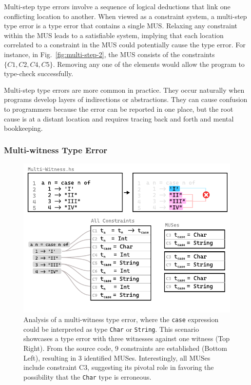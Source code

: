 \documentclass[pdflatex,lineno,sn-nature,Numbered]{sn-jnl}%
\begin{document}
Multi-step type errors involve a sequence of logical deductions that link one conflicting location to another. When viewed as a constraint system, a multi-step type error is a type error that contains a single MUS. Relaxing any constraint within the MUS leads to a satisfiable system, implying that each location correlated to a constraint in the MUS could potentially cause the type error. For instance, in Fig.~\ref{fig:multi-step-2}, the MUS consists of the constraints $\{C1, C2, C4, C5\}$. Removing any one of the elements would allow the program to type-check successfully.

Multi-step type errors are more common in practice. They occur naturally when programs develop layers of indirections or abstractions. They can cause confusion to programmers because the error can be reported in one place, but the root cause is at a distant location and requires tracing back and forth and mental bookkeeping. 


\subsubsection*{Multi-witness Type Error} 

\begin{figure}[hbt]
    \centering
\includegraphics[width=\linewidth]{images/Multi-Witness-MUS}
  \caption{\label{fig:multi-witness-2}
    Analysis of a multi-witness type error, where the \texttt{case} expression could be interpreted as type \texttt{Char} or \texttt{String}. This scenario showcases a type error with three witnesses against one witness (Top Right). From the source code, 9 constraints are established (Bottom Left), resulting in 3 identified MUSes. Interestingly, all MUSes include constraint C3, suggesting its pivotal role in favoring the possibility that the \texttt{Char} type is erroneous.
  }
  \end{figure}
\end{document}
